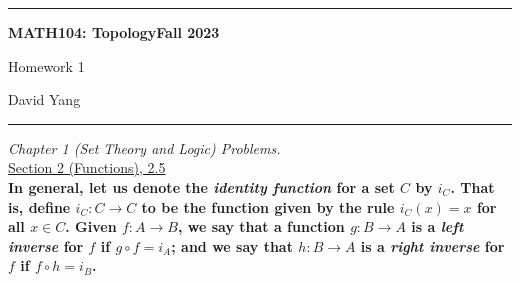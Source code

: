 \documentclass[11pt]{article}
\begin{document}
	\hrule
	\begin{center}
        \textbf{MATH104: Topology}\hfill \textbf{Fall 2023}\newline

		{\Large Homework 1}

		David Yang
	\end{center}

\hrule

\vspace{1em}

\textit{Chapter 1 (Set Theory and Logic) Problems.} \\

\underline{Section 2 (Functions), 2.5} \\

\textbf{In general, let us denote the \textit{identity function} for a set $C$ by $i_C$. That is,
define $i_C \colon C \rightarrow C$ to be the function given by the rule $i_C(x) = x$ for all $x \in C$. Given $f \colon A \rightarrow B$, we say that a function
$g \colon B \rightarrow A$ is a \textit{left inverse} for $f$ if $g \circ f = i_A$; and we say that $h \colon B \rightarrow A$ is a \textit{right inverse} for $f$ if
$f \circ h = i_B$.}
\end{document}
